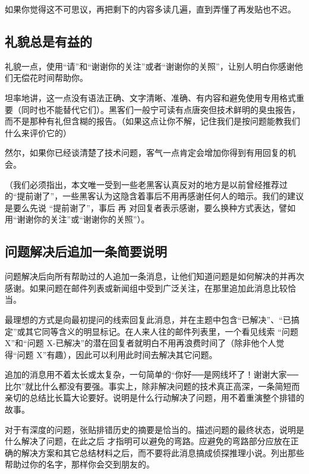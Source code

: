 如果你觉得这不可思议，再把剩下的内容多读几遍，直到弄懂了再发贴也不迟。





\subsection{礼貌总是有益的}

礼貌一点，使用“请”和“谢谢你的关注”或者“谢谢你的关照”，让别人明白你感谢他们无偿花时间帮助你。

坦率地讲，这一点没有语法正确、文字清晰、准确、有内容和避免使用专用格式重要（同时也不能替代它们）。黑客们一般宁可读有点唐突但技术鲜明的臭虫报告，而不是那种有礼但含糊的报告。（如果这点让你不解，记住我们是按问题能教我们什么来评价它的）

然尔，如果你已经谈清楚了技术问题，客气一点肯定会增加你得到有用回复的机会。

（我们必须指出，本文唯一受到一些老黑客认真反对的地方是以前曾经推荐过的“提前谢了”，一些黑客认为这隐含着事后不用再感谢任何人的暗示。我们的建议是要么先说 “提前谢了”，事后 再 对回复者表示感谢，要么换种方式表达，譬如用“谢谢你的关注”或“谢谢你的关照”）。





\subsection{问题解决后追加一条简要说明}

问题解决后向所有帮助过的人追加一条消息，让他们知道问题是如何解决的并再次感谢。如果问题在邮件列表或新闻组中受到广泛关注，在那里追加此消息比较恰当。

最理想的方式是向最初提问的线索回复此消息，并在主题中包含“已解决”、“已搞定”或其它同等含义的明显标记。在人来人往的邮件列表里，一个看见线索 “问题 X”和“问题 X-已解决”的潜在回复者就明白不用再浪费时间了（除非他个人觉得“问题 X”有趣），因此可以利用此时间去解决其它问题。

追加的消息用不着太长或太复杂，一句简单的“你好──是网线坏了！谢谢大家──比尔”就比什么都没有要强。事实上，除非解决问题的技术真正高深，一条简短而亲切的总结比长篇大论要好。说明是什么行动解决了问题，用不着重演整个排错的故事。

对于有深度的问题，张贴排错历史的摘要是恰当的。描述问题的最终状态，说明是什么解决了问题，在此之后 才指明可以避免的弯路。应避免的弯路部分应放在正确的解决方案和其它总结材料之后，而不要将此消息搞成侦探推理小说。列出那些帮助过你的名字，那样你会交到朋友的。

